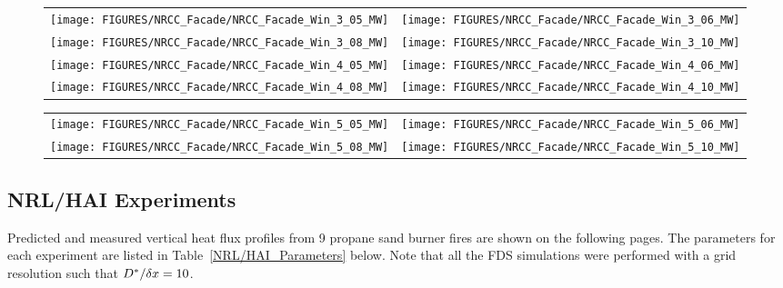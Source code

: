 \begin{figure}[p]
\begin{tabular*}{\textwidth}{l@{\extracolsep{\fill}}r}
\texttt{[image: FIGURES/NRCC\_Facade/NRCC\_Facade\_Win\_3\_05\_MW]} &
\texttt{[image: FIGURES/NRCC\_Facade/NRCC\_Facade\_Win\_3\_06\_MW]} \\
\texttt{[image: FIGURES/NRCC\_Facade/NRCC\_Facade\_Win\_3\_08\_MW]} &
\texttt{[image: FIGURES/NRCC\_Facade/NRCC\_Facade\_Win\_3\_10\_MW]} \\
\texttt{[image: FIGURES/NRCC\_Facade/NRCC\_Facade\_Win\_4\_05\_MW]} &
\texttt{[image: FIGURES/NRCC\_Facade/NRCC\_Facade\_Win\_4\_06\_MW]} \\
\texttt{[image: FIGURES/NRCC\_Facade/NRCC\_Facade\_Win\_4\_08\_MW]} &
\texttt{[image: FIGURES/NRCC\_Facade/NRCC\_Facade\_Win\_4\_10\_MW]}
\end{tabular*}
\label{NRCC_Facade_2}
\end{figure}

\begin{figure}[p]
\begin{tabular*}{\textwidth}{l@{\extracolsep{\fill}}r}
\texttt{[image: FIGURES/NRCC\_Facade/NRCC\_Facade\_Win\_5\_05\_MW]} &
\texttt{[image: FIGURES/NRCC\_Facade/NRCC\_Facade\_Win\_5\_06\_MW]} \\
\texttt{[image: FIGURES/NRCC\_Facade/NRCC\_Facade\_Win\_5\_08\_MW]} &
\texttt{[image: FIGURES/NRCC\_Facade/NRCC\_Facade\_Win\_5\_10\_MW]}
\end{tabular*}
\label{NRCC_Facade_3}
\end{figure}


\clearpage



\subsection{NRL/HAI Experiments}

Predicted and measured vertical heat flux profiles from 9 propane sand burner fires are shown on the following pages. The parameters for each
experiment are listed in Table~\ref{NRL/HAI_Parameters} below. Note that all the FDS simulations were performed with a grid resolution such that
$D^*/\delta x=10$.

